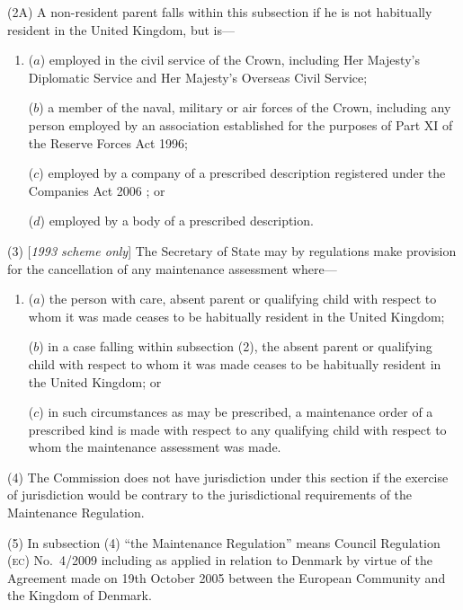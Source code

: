 \documentclass[12pt,a4paper]{article}
\begin{document}
(2A) A non-resident parent falls within this subsection if he is not habitually resident in the United Kingdom, but is—
\begin{enumerate}\item[]
($a$) employed in the civil service of the Crown, including Her Majesty’s Diplomatic Service and Her Majesty’s Overseas Civil Service;

($b$) a member of the naval, military or air forces of the Crown, including any person employed by an association established for the purposes of Part XI of the Reserve Forces Act 1996;

($c$) employed by a company of a prescribed description 
registered under the Companies Act 2006%
; or

($d$) employed by a body of a prescribed description.
\end{enumerate}

(3) [\emph{1993 scheme only}] The Secretary of State may by regulations make provision for the cancellation of any maintenance assessment where—
\begin{enumerate}\item[]
($a$) the person with care, absent parent or qualifying child with respect to whom it was made ceases to be habitually resident in the United Kingdom;

($b$) in a case falling within subsection (2), the absent parent or qualifying child with respect to whom it was made ceases to be habitually resident in the United Kingdom; or

($c$) in such circumstances as may be prescribed, a maintenance order of a prescribed kind is made with respect to any qualifying child with respect to whom the maintenance assessment was made.
\end{enumerate}

(4) The Commission does not have jurisdiction under this section if the exercise of jurisdiction would be contrary to the jurisdictional requirements of the Maintenance Regulation.

(5) In subsection (4) “the Maintenance Regulation” means Council Regulation (\textsc{\lowercase{EC}}) No.~4/2009 including as applied in relation to Denmark by virtue of the Agreement made on 19th October 2005 between the European Community and the Kingdom of Denmark.
\end{document}

